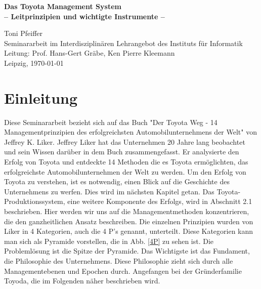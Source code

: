 \documentclass[a4paper,12pt]{scrartcl}
\begin{document}
\begin{titlepage}
\begin{center}


\vspace*{1cm}

\bigskip
\bigskip
\large


\bigskip
\bigskip
\bigskip
\bigskip
\bigskip
\bigskip
\bigskip
\bigskip
\bigskip
{\LARGE \bfseries Das Toyota Management System   }\\
{\bfseries -- Leitprinzipien und wichtigte Instrumente --}


\bigskip
\bigskip
\bigskip
\bigskip

Toni Pfeiffer \\

\bigskip
\bigskip
\bigskip
\bigskip
\bigskip
\bigskip
\bigskip
\bigskip
\bigskip
\bigskip
\bigskip
\bigskip
Seminararbeit im Interdisziplinären Lehrangebot
des Instituts für Informatik \\
\bigskip
\bigskip
Leitung: Prof. Hans-Gert Gräbe, Ken Pierre Kleemann\\ 
\bigskip
\bigskip
\bigskip
\bigskip
\bigskip
\bigskip
\bigskip
\bigskip
\bigskip
\bigskip
\bigskip
\bigskip
\bigskip
\bigskip
Leipzig, \today

\end{center}

\bigskip
\bigskip
\bigskip
\bigskip
\bigskip

\end{titlepage}

\clearpage
\tableofcontents
\clearpage
\clearpage
{}
\listoffigures
\clearpage

\section{Einleitung}

Diese Seminararbeit bezieht sich auf das Buch "Der Toyota Weg - 14 Managementprinzipien des erfolgreichsten Automobilunternehmens der Welt" von Jeffrey K. Liker. Jeffrey Liker hat das Unternehmen 20 Jahre lang beobachtet und sein Wissen darüber in dem Buch zusammengefasst. Er analysierte den Erfolg von Toyota und entdeckte 14 Methoden die es Toyota ermöglichten, das erfolgreichste Automobilunternehmen der Welt zu werden. Um den Erfolg von Toyota zu verstehen, ist es notwendig, einen Blick auf die Geschichte des Unternehmens zu werfen. Dies wird im nächsten Kapitel getan. Das Toyota-Produktionssystem, eine weitere Komponente des Erfolgs, wird in Abschnitt 2.1 beschrieben. Hier werden wir uns auf die Managementmethoden konzentrieren, die den ganzheitlichen Ansatz beschreiben. Die einzelnen Prinzipien wurden von Liker in 4 Kategorien, auch die 4 P's genannt, unterteilt. Diese Kategorien kann man sich als Pyramide vorstellen, die in Abb. \ref{4P} zu sehen ist. Die Problemlösung ist die Spitze der Pyramide. Das Wichtigste ist das Fundament, die Philosophie des Unternehmens. Diese Philosophie zieht sich durch alle Managementebenen und Epochen durch. Angefangen bei der Gründerfamilie Toyoda, die im Folgenden näher beschrieben wird.
\end{document}
